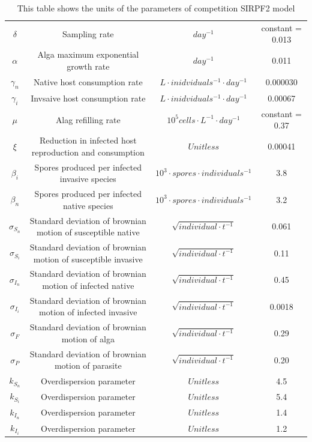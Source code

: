 \documentclass[12pt]{article}
\begin{document}
\begin{table}[H]
{\begin{tabular}{||c|c |c|c||}
$\delta$ & Sampling rate&$day ^{-1} $& constant = 0.013\\
$\alpha$ & Alga maximum exponential growth rate&$day ^{-1} $ & 0.011\\
$\gamma_n$ & Native host consumption rate&$L \cdot inidviduals^{-1} \cdot day ^{-1} $ & 0.000030\\
$\gamma_i$ & Invsaive host consumption rate&$L \cdot inidviduals^{-1} \cdot day ^{-1} $ & 0.00067\\
$\mu$ & Alag refilling rate&$10^5 cells \cdot L ^{-1} \cdot day^{-1}$ & constant = 0.37\\
$\xi$ &Reduction in infected host reproduction and consumption& $Unitless$ & 0.00041\\
$\beta_i$ & Spores produced per infected invasive species&$10^3 \cdot spores \cdot individuals^{-1} $ &3.8\\
$\beta_n$ & Spores produced per infected native species&$10^3 \cdot spores \cdot individuals^{-1} $ &3.2\\
$\sigma_{S_n}$ & Standard deviation of brownian motion of susceptible native&$\sqrt{individual \cdot t^{-1}}$ & 0.061\\
$\sigma_{S_i}$ & Standard deviation of brownian motion of susceptible invasive &$\sqrt{individual \cdot t^{-1}}$ & 0.11\\
$\sigma_{I_n}$ & Standard deviation of brownian motion of infected native&$\sqrt{individual \cdot t^{-1}}$ & 0.45\\
$\sigma_{I_i}$ & Standard deviation of brownian motion of infected invasive&$\sqrt{individual \cdot t^{-1}}$ & 0.0018\\
$\sigma_{F}$ & Standard deviation of brownian motion of alga&$\sqrt{individual \cdot t^{-1}}$ & 0.29\\
$\sigma_{P}$ &Standard deviation of brownian motion of parasite &$\sqrt{individual \cdot t^{-1}}$ & 0.20\\
$k_{S_n}$ & Overdispersion parameter& $Unitless$ &4.5\\
$k_{S_i}$ &Overdispersion parameter &$Unitless$ &5.4\\
$k_{I_n}$ &Overdispersion parameter &$Unitless$ &1.4\\
$k_{I_i}$ & Overdispersion parameter&$Unitless$ &1.2\\[1ex]
 \hline
\end{tabular}}
\caption{This table shows the units of the parameters of competition SIRPF2 model}
\label{Table:1}
\end{table}
\renewcommand{\arraystretch}{1}










\end{document}
